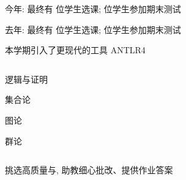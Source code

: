\begin{frame}{}
  \begin{center}

    \vspace{1.00cm}
    今年: 最终有  位学生选课;  位学生参加期末测试

    \vspace{1.00cm}
    去年: 最终有  位学生选课;  位学生参加期末测试
  \end{center}
\end{frame}

\begin{frame}{}
  \begin{center}

    \vspace{0.30cm}
    本学期引入了更现代的工具 ANTLR4
  \end{center}
\end{frame}

\begin{frame}{}
\end{frame}

\begin{frame}{}
  \begin{columns}
    \begin{center}
      {逻辑与证明}

      \vspace{1.50cm}
      {集合论}

      \vspace{2.00cm}
      {图论}

      \vspace{1.20cm}
      {群论}
    \end{center}
  \end{columns}
\end{frame}

\begin{frame}{}
  \begin{center}
    挑选高质量与, 助教细心批改、提供作业答案

    \vspace{0.30cm}
  \end{center}
\end{frame}
